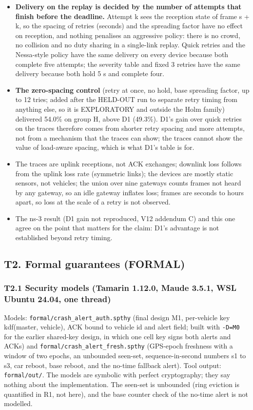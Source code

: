 \begin{itemize}
\item \textbf{Delivery on the replay is decided by the number of attempts that finish before the deadline.} Attempt k sees the reception state of frame s + k, so the spacing of retries (seconds) and the spreading factor have no effect on reception, and nothing penalises an aggressive policy: there is no crowd, no collision and no duty sharing in a single-link replay. Quick retries and the Nessa-style policy have the same delivery on every device because both complete five attempts; the severity table and fixed 3 retries have the same delivery because both hold 5 s and complete four.
\item \textbf{The zero-spacing control} (retry at once, no hold, base spreading factor, up to 12 tries; added after the HELD-OUT run to separate retry timing from anything else, so it is EXPLORATORY and outside the Holm family) delivered 54.0\% on group H, above D1 (49.3\%). D1's gain over quick retries on the traces therefore comes from shorter retry spacing and more attempts, not from a mechanism that the traces can show; the traces cannot show the value of load-aware spacing, which is what D1's table is for.
\item The traces are uplink receptions, not ACK exchanges; downlink loss follows from the uplink loss rate (symmetric links); the devices are mostly static sensors, not vehicles; the union over nine gateways counts frames not heard by any gateway, so an idle gateway inflates loss; frames are seconds to hours apart, so loss at the scale of a retry is not observed.
\item The ns-3 result (D1 gain not reproduced, V12 addendum C) and this one agree on the point that matters for the claim: D1's advantage is not established beyond retry timing.
\end{itemize}

\subsection*{T2. Formal guarantees (FORMAL)}

\subsubsection*{T2.1 Security models (Tamarin 1.12.0, Maude 3.5.1, WSL Ubuntu 24.04, one thread)}

Models: \texttt{formal/crash\_alert\_auth.spthy} (final design M1, per-vehicle key kdf(master, vehicle), ACK bound to vehicle id and alert field; built with \texttt{-D=M0} for the earlier shared-key design, in which one cell key signs both alerts and ACKs) and \texttt{formal/crash\_alert\_fresh.spthy} (GPS-epoch freshness with a window of two epochs, an unbounded seen-set, sequence-in-second numbers s1 to s3, car reboot, base reboot, and the no-time fallback alert). Tool output: \texttt{formal/out/}. The models are symbolic with perfect cryptography; they say nothing about the implementation. The seen-set is unbounded (ring eviction is quantified in R1, not here), and the base counter check of the no-time alert is not modelled.

